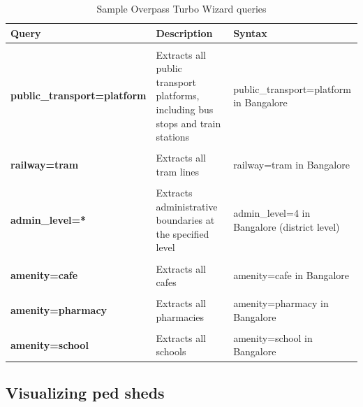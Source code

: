 \documentclass[
]{latex/krantz}
\begin{document}
\begin{table}

\caption{\label{tab:osm-queries}Sample Overpass Turbo Wizard queries}
\centering
\begin{tabular}[t]{>{\raggedright\arraybackslash}p{12em}>{\raggedright\arraybackslash}p{10em}l}
\toprule
Query & Description & Syntax\\
\midrule
\textbf{\cellcolor{gray!6}{highway=* and name=*}} & \cellcolor{gray!6}{Extracts all roads with their names} & \cellcolor{gray!6}{highway=* and name=* in Bangalore}\\
\textbf{public\_transport=platform} & Extracts all public transport platforms, including bus stops and train stations & public\_transport=platform in Bangalore\\
\textbf{\cellcolor{gray!6}{railway=station}} & \cellcolor{gray!6}{Extracts all railway stations} & \cellcolor{gray!6}{railway=station in Bangalore}\\
\textbf{railway=tram} & Extracts all tram lines & railway=tram in Bangalore\\
\textbf{\cellcolor{gray!6}{route=bus}} & \cellcolor{gray!6}{Extracts all bus routes} & \cellcolor{gray!6}{route=bus in Bangalore}\\
\addlinespace
\textbf{admin\_level=*} & Extracts administrative boundaries at the specified level & admin\_level=4 in Bangalore (district level)\\
\textbf{\cellcolor{gray!6}{amenity=restaurant}} & \cellcolor{gray!6}{Extracts all restaurants} & \cellcolor{gray!6}{amenity=restaurant in Bangalore}\\
\textbf{amenity=cafe} & Extracts all cafes & amenity=cafe in Bangalore\\
\textbf{\cellcolor{gray!6}{amenity=pub}} & \cellcolor{gray!6}{Extracts all pubs} & \cellcolor{gray!6}{amenity=pub in Bangalore}\\
\textbf{amenity=pharmacy} & Extracts all pharmacies & amenity=pharmacy in Bangalore\\
\addlinespace
\textbf{\cellcolor{gray!6}{amenity=hospital}} & \cellcolor{gray!6}{Extracts all hospitals} & \cellcolor{gray!6}{amenity=hospital in Bangalore}\\
\textbf{amenity=school} & Extracts all schools & amenity=school in Bangalore\\
\bottomrule
\end{tabular}
\end{table}

\hypertarget{pedsheds}{%
\subsection{Visualizing ped sheds}\label{pedsheds}}
\end{document}
